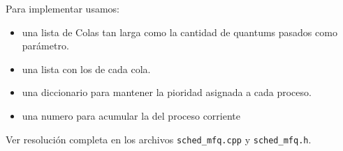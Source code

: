 Para implementar \mfq usamos:

\begin{itemize}
 \item una lista de Colas tan larga como la cantidad de quantums pasados como par\'ametro.
 \item una lista con los \quantums de cada cola.
 \item una diccionario para mantener la pioridad asignada a cada proceso.
 \item una numero para acumular la \quota del proceso corriente
\end{itemize}

Ver resoluci\'on completa en los archivos \verb|sched_mfq.cpp| y \verb|sched_mfq.h|.
